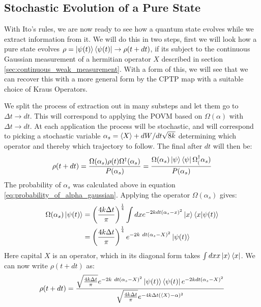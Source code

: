 \subsection{Stochastic Evolution of a Pure State}
With Ito's rules, we are now ready to see how a quantum state evolves while we extract information from it. We will do this in two steps, first we will look how a pure state evolves $\rho = \ket{\psi(t)}\bra{\psi(t)} \to \rho(t+dt)$, if its subject to the continuous Gaussian measurement of a hermitian operator $X$ described in section \ref{sec:continuous_weak_measurement}. With a form of this, we will see that we can recover this with a more general form by the CPTP map with a suitable choice of Kraus Operators.

We split the process of extraction out in many substeps and let them go to $\Delta t \to dt$. This will correspond to applying the POVM based on ${\Omega(\alpha)}$ with $\Delta t \to dt$. At each application the process will be stochastic, and will correspond to picking a stochastic variable $\alpha_s =\expval{X} + {dW}/{dt \sqrt{8k}}$ determining which operator and thereby which trajectory to follow. The final after $dt$ will then be:
\begin{equation}
    \rho(t+dt) = \frac{\Omega(\alpha_s) \rho(t)  \Omega^\dagger(\alpha_s)}{P(\alpha_s)} = \frac{\Omega(\alpha_s) \ket{\psi}\bra{\psi}  \Omega^\dagger_(\alpha_s)}{P(\alpha_s)} 
\end{equation}
The probability of $\alpha_s$ was calculated above in equation \ref{eq:probability_of_alpha_gaussian}. Applying the operator $\Omega(\alpha_s)$ gives:
\begin{align*}
    \Omega(\alpha_s)\ket{\psi(t)} &=  \left(\frac{4 k \Delta t}{\pi}\right)^\frac14\int dx e^{-2k dt (\alpha_s - x)^2} \ket{x}\bra{x} \ket{\psi(t)} \\
                                  &=  \left(\frac{4 k \Delta t}{\pi}\right)^\frac14 e^{-2k\ dt (\alpha_s - X)^2} \ket{\psi(t)}
\end{align*}
Here capital $X$ is an operator, which in its diagonal form takes $\int dx x \ket{x}\bra{x}$. We can now write $\rho(t+dt)$ as:
\begin{equation}
    \rho(t + dt) =\frac{\sqrt{\frac{4 k \Delta t}{\pi}}e^{-2k\ dt (\alpha_s - X)^2} \ket{\psi(t)}\bra{\psi(t)}e^{-2k dt (\alpha_s - X)^2}}{\sqrt{\frac{4 k \Delta t}{\pi}}  e^{-4k\Delta t (\expval{X} - \alpha)^2}}    
\end{equation}
